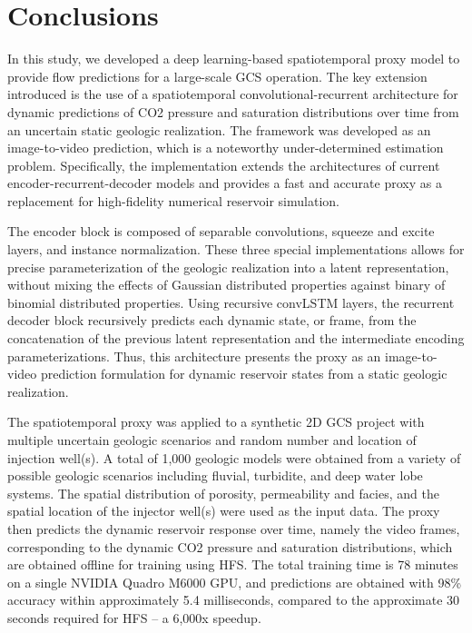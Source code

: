 \documentclass[default,iicol,lineno]{sn-jnl}%
\begin{document}
\section{Conclusions}\label{sec5_conclusions}
In this study, we developed a deep learning-based spatiotemporal proxy model to provide flow predictions for a large-scale GCS operation. The key extension introduced is the use of a spatiotemporal convolutional-recurrent architecture for dynamic predictions of CO2 pressure and saturation distributions over time from an uncertain static geologic realization. The framework was developed as an image-to-video prediction, which is a noteworthy under-determined estimation problem. Specifically, the implementation extends the architectures of current encoder-recurrent-decoder models and provides a fast and accurate proxy as a replacement for high-fidelity numerical reservoir simulation.

The encoder block is composed of separable convolutions, squeeze and excite layers, and instance normalization. These three special implementations allows for precise parameterization of the geologic realization into a latent representation, without mixing the effects of Gaussian distributed properties against binary of binomial distributed properties. Using recursive convLSTM layers, the recurrent decoder block recursively predicts each dynamic state, or frame, from the concatenation of the previous latent representation and the intermediate encoding parameterizations. Thus, this architecture presents the proxy as an image-to-video prediction formulation for dynamic reservoir states from a static geologic realization.

The spatiotemporal proxy was applied to a synthetic 2D GCS project with multiple uncertain geologic scenarios and random number and location of injection well(s). A total of 1,000 geologic models were obtained from a variety of possible geologic scenarios including fluvial, turbidite, and deep water lobe systems. The spatial distribution of porosity, permeability and facies, and the spatial location of the injector well(s) were used as the input data. The proxy then predicts the dynamic reservoir response over time, namely the video frames, corresponding to the dynamic CO2 pressure and saturation distributions, which are obtained offline for training using HFS. The total training time is 78 minutes on a single NVIDIA Quadro M6000 GPU, and predictions are obtained with 98\% accuracy within approximately 5.4 milliseconds, compared to the approximate 30 seconds required for HFS – a 6,000x speedup. 
\end{document}
